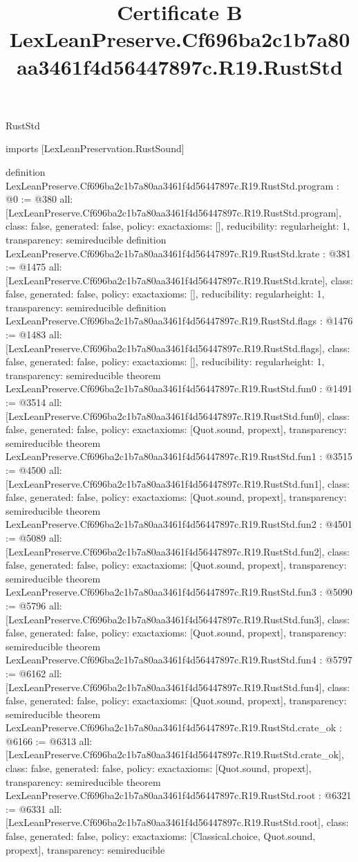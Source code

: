 \begin{lexlean}{RustStd}
\title{Certificate B LexLeanPreserve.Cf696ba2c1b7a80aa3461f4d56447897c.R19.RustStd}
\begin{coremodule}
imports [LexLeanPreservation.RustSound]

definition LexLeanPreserve.Cf696ba2c1b7a80aa3461f4d56447897c.R19.RustStd.program : @0 := @380 {
  all: [LexLeanPreserve.Cf696ba2c1b7a80aa3461f4d56447897c.R19.RustStd.program],
  class: false,
  generated: false,
  policy: exact{axioms: []},
  reducibility: regular{height: 1},
  transparency: semireducible
}
definition LexLeanPreserve.Cf696ba2c1b7a80aa3461f4d56447897c.R19.RustStd.krate : @381 := @1475 {
  all: [LexLeanPreserve.Cf696ba2c1b7a80aa3461f4d56447897c.R19.RustStd.krate],
  class: false,
  generated: false,
  policy: exact{axioms: []},
  reducibility: regular{height: 1},
  transparency: semireducible
}
definition LexLeanPreserve.Cf696ba2c1b7a80aa3461f4d56447897c.R19.RustStd.flags : @1476 := @1483 {
  all: [LexLeanPreserve.Cf696ba2c1b7a80aa3461f4d56447897c.R19.RustStd.flags],
  class: false,
  generated: false,
  policy: exact{axioms: []},
  reducibility: regular{height: 1},
  transparency: semireducible
}
theorem LexLeanPreserve.Cf696ba2c1b7a80aa3461f4d56447897c.R19.RustStd.fun0 : @1491 := @3514 {
  all: [LexLeanPreserve.Cf696ba2c1b7a80aa3461f4d56447897c.R19.RustStd.fun0],
  class: false,
  generated: false,
  policy: exact{axioms: [Quot.sound, propext]},
  transparency: semireducible
}
theorem LexLeanPreserve.Cf696ba2c1b7a80aa3461f4d56447897c.R19.RustStd.fun1 : @3515 := @4500 {
  all: [LexLeanPreserve.Cf696ba2c1b7a80aa3461f4d56447897c.R19.RustStd.fun1],
  class: false,
  generated: false,
  policy: exact{axioms: [Quot.sound, propext]},
  transparency: semireducible
}
theorem LexLeanPreserve.Cf696ba2c1b7a80aa3461f4d56447897c.R19.RustStd.fun2 : @4501 := @5089 {
  all: [LexLeanPreserve.Cf696ba2c1b7a80aa3461f4d56447897c.R19.RustStd.fun2],
  class: false,
  generated: false,
  policy: exact{axioms: [Quot.sound, propext]},
  transparency: semireducible
}
theorem LexLeanPreserve.Cf696ba2c1b7a80aa3461f4d56447897c.R19.RustStd.fun3 : @5090 := @5796 {
  all: [LexLeanPreserve.Cf696ba2c1b7a80aa3461f4d56447897c.R19.RustStd.fun3],
  class: false,
  generated: false,
  policy: exact{axioms: [Quot.sound, propext]},
  transparency: semireducible
}
theorem LexLeanPreserve.Cf696ba2c1b7a80aa3461f4d56447897c.R19.RustStd.fun4 : @5797 := @6162 {
  all: [LexLeanPreserve.Cf696ba2c1b7a80aa3461f4d56447897c.R19.RustStd.fun4],
  class: false,
  generated: false,
  policy: exact{axioms: [Quot.sound, propext]},
  transparency: semireducible
}
theorem LexLeanPreserve.Cf696ba2c1b7a80aa3461f4d56447897c.R19.RustStd.crate_ok : @6166 := @6313 {
  all: [LexLeanPreserve.Cf696ba2c1b7a80aa3461f4d56447897c.R19.RustStd.crate_ok],
  class: false,
  generated: false,
  policy: exact{axioms: [Quot.sound, propext]},
  transparency: semireducible
}
theorem LexLeanPreserve.Cf696ba2c1b7a80aa3461f4d56447897c.R19.RustStd.root : @6321 := @6331 {
  all: [LexLeanPreserve.Cf696ba2c1b7a80aa3461f4d56447897c.R19.RustStd.root],
  class: false,
  generated: false,
  policy: exact{axioms: [Classical.choice, Quot.sound, propext]},
  transparency: semireducible
}


\end{coremodule}
\end{lexlean}
